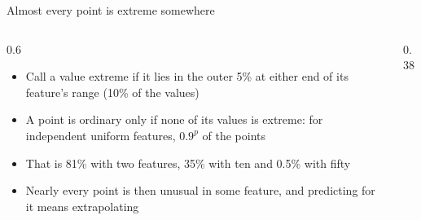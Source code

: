 \begin{frame}{Almost every point is extreme somewhere}
    \begin{columns}[T]
        \begin{column}{0.6\textwidth}
            \begin{itemize}
                \item Call a value extreme if it lies in the outer 5\% at either end of its feature's range (10\% of the values)
                \item A point is ordinary only if none of its values is extreme: for independent uniform features, $0.9^p$ of the points
                \item That is 81\% with two features, 35\% with ten and 0.5\% with fifty
                \item Nearly every point is then unusual in some feature, and predicting for it means extrapolating
            \end{itemize}
        \end{column}
        \begin{column}{0.38\textwidth}
            \centering
        \end{column}
    \end{columns}
\end{frame}

